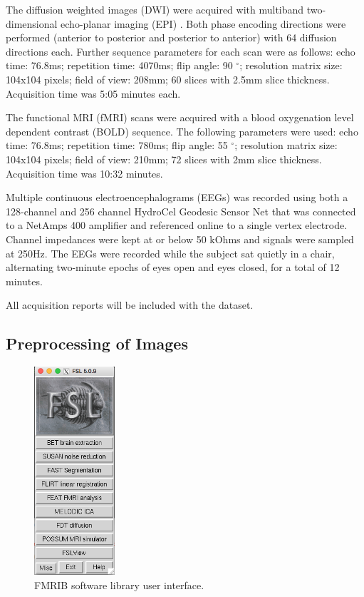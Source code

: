 The diffusion weighted images (DWI) were acquired with multiband two-dimensional echo-planar imaging (EPI) \cite{ref:epi}. Both phase encoding directions were performed (anterior to posterior and posterior to anterior) with 64 diffusion directions each. Further sequence parameters for each scan were as follows: echo time: 76.8ms; repetition time: 4070ms; flip angle: 90 $^{\circ}$; resolution matrix size: 104x104 pixels; field of view: 208mm; 60 slices with 2.5mm slice thickness. Acquisition time was 5:05 minutes each.

The functional MRI (fMRI) scans were acquired with a blood oxygenation level dependent contrast (BOLD) sequence. The following parameters were used: echo time: 76.8ms; repetition time: 780ms; flip angle: 55 $^{\circ}$; resolution matrix size: 104x104 pixels; field of view: 210mm; 72 slices with 2mm slice thickness. Acquisition time was 10:32 minutes.

Multiple continuous electroencephalograms (EEGs) was recorded using both a 128-channel and 256 channel HydroCel Geodesic Sensor Net that was connected to a NetAmps 400 amplifier and referenced online to a single vertex electrode. Channel impedances were kept at or below 50 kOhms and signals were sampled at 250Hz. The EEGs were recorded while the subject sat quietly in a chair, alternating two-minute epochs of eyes open and eyes closed, for a total of 12 minutes.

All acquisition reports will be included with the dataset.

\subsection{Preprocessing of Images}
\label{sec:preprocess}

\begin{figure}
    \centering
    \vspace{-63pt}
    \includegraphics[width=3cm]{Figures/FSL}
    \caption{FMRIB software library user interface.}
    \label{fig:fsl}
\end{figure}

